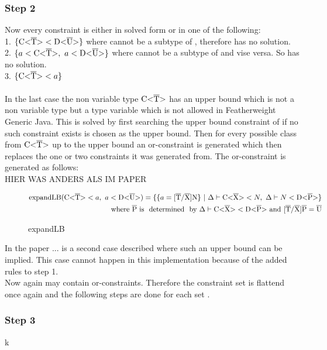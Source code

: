 \subsubsection{Step 2}
Now every constraint is either in solved form or in one of the following: \\
1. $\{ \text{C<}\overline{\text{T}}\text{>} < \text{D<}\overline{\text{U}}\text{>} \}$ where  cannot be a subtype of , therefore  has no solution.\\
2. $\{ a < \text{C<}\overline{\text{T}}\text{>}, \ a < \text{D<}\overline{\text{U}}\text{>} \}$ where  cannot be a subtype of  and vise versa. So  has no solution.\\
3. $\{ \text{C<}\overline{\text{T}}\text{>} < a \}$\\
\\
In the last case the non variable type $\text{C<}\overline{\text{T}}\text{>}$ has an upper bound which is not a non variable type but a type variable which is not allowed in Featherweight Generic Java.
This is solved by first searching the upper bound constraint of  if no such constraint exists  is chosen as the upper bound. Then for every possible class
from $\text{C<}\overline{\text{T}}\text{>}$ up to the upper bound an or-constraint is generated which then replaces the one or two constraints it was generated from.
The or-constraint is generated as follows:
\\
HIER WAS ANDERS ALS IM PAPER

\begin{figure}[H]
    \begin{align*}
        \text{expandLB} ( \nvt{C}{T} < a, \ a < \nvt{D}{U} ) = \{ \{ a = \tsxsn{T}{X}{N} \} \ | \ \Delta \vdash \nvt{C}{X} < N, \ \Delta \vdash N < \nvt{D}{P} \}\\
        \text{where} \ \ot{P} \ \text{is \ determined \ by } \Delta \vdash \nvt{C}{X} < \nvt{D}{P} \ \text{and} \ \tsxsns{T}{X}{P} = \ot{U}
    \end{align*}
    \caption{expandLB}
    \label{expandlb}
\end{figure}

In the paper ...  is a second case described where such an upper bound can be implied. This case cannot happen in this implementation because of the added rules to step 1.\\
Now  again may contain or-constraints. Therefore the constraint set  is flattend once again and the following steps are done for each set .

\subsubsection{Step 3}
k
